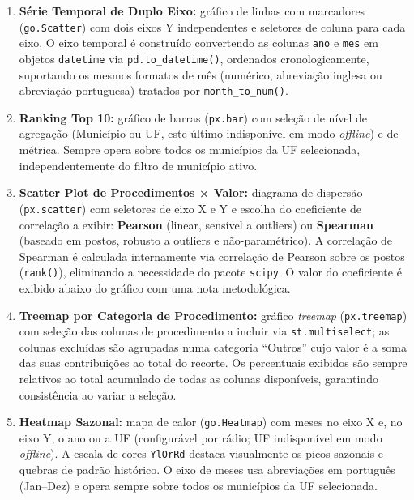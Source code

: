 \documentclass[12pt,a4paper]{report}
\begin{document}
\begin{enumerate}
    \item \textbf{Série Temporal de Duplo Eixo:} gráfico de linhas com marcadores
    (\texttt{go.Scatter}) com dois eixos Y independentes e seletores de coluna para
    cada eixo. O eixo temporal é construído convertendo as colunas \texttt{ano} e
    \texttt{mes} em objetos \texttt{datetime} via \texttt{pd.to\_datetime()},
    ordenados cronologicamente, suportando os mesmos formatos de mês (numérico,
    abreviação inglesa ou abreviação portuguesa) tratados por \texttt{month\_to\_num()}.

    \item \textbf{Ranking Top 10:} gráfico de barras (\texttt{px.bar}) com seleção de
    nível de agregação (Município ou UF, este último indisponível em modo
    \textit{offline}) e de métrica. Sempre opera sobre todos os municípios da UF
    selecionada, independentemente do filtro de município ativo.

    \item \textbf{Scatter Plot de Procedimentos × Valor:} diagrama de dispersão
    (\texttt{px.scatter}) com seletores de eixo X e Y e escolha do coeficiente de
    correlação a exibir: \textbf{Pearson} (linear, sensível a outliers) ou
    \textbf{Spearman} (baseado em postos, robusto a outliers e não-paramétrico).
    A correlação de Spearman é calculada internamente via correlação de Pearson sobre
    os postos (\texttt{rank()}), eliminando a necessidade do pacote \texttt{scipy}.
    O valor do coeficiente é exibido abaixo do gráfico com uma nota metodológica.

    \item \textbf{Treemap por Categoria de Procedimento:} gráfico \textit{treemap}
    (\texttt{px.treemap}) com seleção das colunas de procedimento a incluir via
    \texttt{st.multiselect}; as colunas excluídas são agrupadas numa categoria
    ``Outros'' cujo valor é a soma das suas contribuições ao total do recorte.
    Os percentuais exibidos são sempre relativos ao total acumulado de todas as colunas
    disponíveis, garantindo consistência ao variar a seleção.

    \item \textbf{Heatmap Sazonal:} mapa de calor (\texttt{go.Heatmap}) com meses
    no eixo X e, no eixo Y, o ano ou a UF (configurável por rádio; UF indisponível em
    modo \textit{offline}). A escala de cores \texttt{YlOrRd} destaca visualmente
    os picos sazonais e quebras de padrão histórico. O eixo de meses usa abreviações
    em português (Jan--Dez) e opera sempre sobre todos os municípios da UF selecionada.
\end{enumerate}
\end{document}
